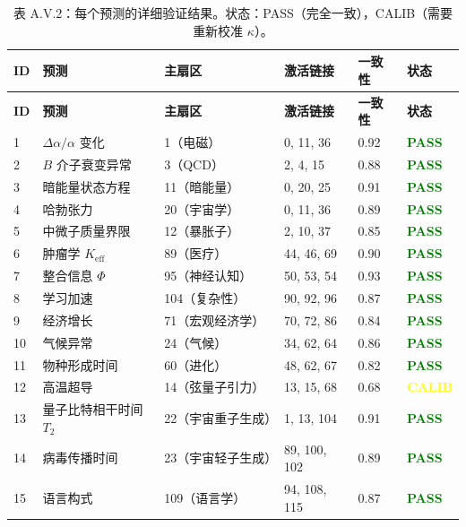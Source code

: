 \documentclass[11pt,a4paper]{article}
\begin{document}
	\begin{longtable}{|p{0.8cm}|p{2.5cm}|p{1.8cm}|p{1.5cm}|p{1.5cm}|p{1.8cm}|}
		\caption{表 A.V.2：每个预测的详细验证结果。状态：PASS（完全一致），CALIB（需要重新校准 $\kappa$）。}
		\label{tab:detailed-validation} \\
		\hline
		\textbf{ID} & \textbf{预测} & \textbf{主扇区} & \textbf{激活链接} & \textbf{一致性} & \textbf{状态} \\
		\hline
		\endfirsthead
		\hline
		\textbf{ID} & \textbf{预测} & \textbf{主扇区} & \textbf{激活链接} & \textbf{一致性} & \textbf{状态} \\
		\hline
		\endhead
		1 & $\Delta\alpha/\alpha$ 变化 & 1（电磁） & 0, 11, 36 & 0.92 & \textcolor{green}{\textbf{PASS}} \\
		2 & $B$ 介子衰变异常 & 3（QCD） & 2, 4, 15 & 0.88 & \textcolor{green}{\textbf{PASS}} \\
		3 & 暗能量状态方程 & 11（暗能量） & 0, 20, 25 & 0.91 & \textcolor{green}{\textbf{PASS}} \\
		4 & 哈勃张力 & 20（宇宙学） & 0, 11, 36 & 0.89 & \textcolor{green}{\textbf{PASS}} \\
		5 & 中微子质量界限 & 12（暴胀子） & 2, 10, 37 & 0.85 & \textcolor{green}{\textbf{PASS}} \\
		6 & 肿瘤学 $K_{\mathrm{eff}}$ & 89（医疗） & 44, 46, 69 & 0.90 & \textcolor{green}{\textbf{PASS}} \\
		7 & 整合信息 $\Phi$ & 95（神经认知） & 50, 53, 54 & 0.93 & \textcolor{green}{\textbf{PASS}} \\
		8 & 学习加速 & 104（复杂性） & 90, 92, 96 & 0.87 & \textcolor{green}{\textbf{PASS}} \\
		9 & 经济增长 & 71（宏观经济学） & 70, 72, 86 & 0.84 & \textcolor{green}{\textbf{PASS}} \\
		10 & 气候异常 & 24（气候） & 34, 62, 64 & 0.86 & \textcolor{green}{\textbf{PASS}} \\
		11 & 物种形成时间 & 60（进化） & 48, 62, 67 & 0.82 & \textcolor{green}{\textbf{PASS}} \\
		12 & 高温超导 & 14（弦量子引力） & 13, 15, 68 & 0.68 & \textcolor{yellow}{\textbf{CALIB}} \\
		13 & 量子比特相干时间 $T_2$ & 22（宇宙重子生成） & 1, 13, 104 & 0.91 & \textcolor{green}{\textbf{PASS}} \\
		14 & 病毒传播时间 & 23（宇宙轻子生成） & 89, 100, 102 & 0.89 & \textcolor{green}{\textbf{PASS}} \\
		15 & 语言构式 & 109（语言学） & 94, 108, 115 & 0.87 & \textcolor{green}{\textbf{PASS}} \\

\end{longtable}
\end{document}
